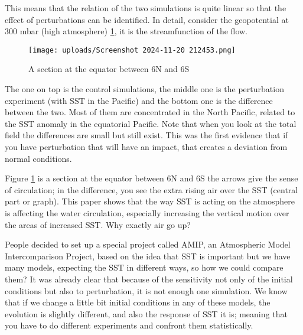 This means that the relation of the two simulations is quite linear so that the effect of perturbations can be identified. In detail, consider the geopotential at 300 mbar (high atmosphere) \ref{fig:figure 1.7}, it is the streamfunction of the flow.
\begin{figure}[htpb]
	\centering
	\texttt{[image: uploads/Screenshot 2024-11-20 212453.png]}
	\caption{A section at the equator between 6N and 6S }
	\label{fig:figure 1.7}
\end{figure}
The one on top is the control simulations, the middle one is the perturbation experiment (with SST in the Pacific) and the bottom one is the difference between the two.
Most of them are concentrated in the North Pacific, related to the SST anomaly in the equatorial Pacific. Note that when you look at the total field the differences are small but still exist.
This was the first evidence that if you have perturbation that will have an impact, that creates a deviation from normal conditions.

Figure \ref{fig:figure 1.7} is a section at the equator between 6N and 6S
the arrows give the sense of circulation; in the difference, you see the extra rising air over the SST (central part or graph). This paper shows that the way SST is acting on the atmosphere is affecting the water circulation, especially increasing the vertical motion over the areas of increased SST. Why exactly air go up?

People decided to set up a special project called AMIP, an Atmospheric Model Intercomparison Project, based on the idea that SST is important but we have many models, expecting the SST in different ways, so how we could compare them?
It was already clear that because of the sensitivity not only of the initial conditions but also to perturbation, it is not enough one simulation.
We know that if we change a little bit initial conditions in any of these models, the evolution is slightly different, and also the response of SST it is; meaning that you have to do different experiments and confront them statistically.

